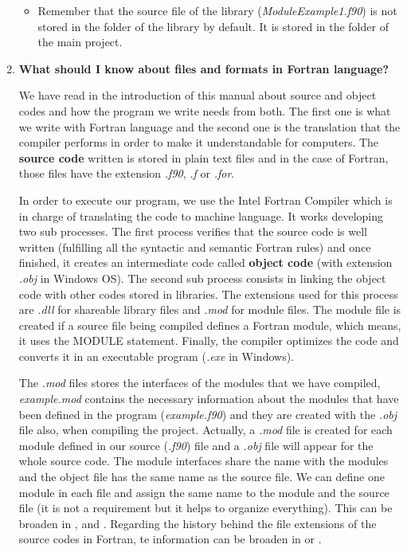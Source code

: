 \begin{enumerate}
\begin{IN}
\begin{itemize}
            \item Remember that the source file of the library (\textit{ModuleExample1.f90}) is not stored in the folder of the library by default. It is stored in the folder of the main project.
        \end{itemize}
    \end{IN}

    

	
    \FloatBarrier
    \item \textbf{What should I know about files and formats in Fortran language?}
    
    We have read in the introduction of this manual about source and object codes and how the program we write needs from both. The first one is what we write with Fortran language and the second one is the translation that the compiler performs in order to make it understandable for computers. The \textbf{source code} written is stored in plain text files and in the case of Fortran, those files have the extension \textit{.f90}, \textit{.f} or \textit{.for}. 
    
    \newpage
    In order to execute our program, we use the Intel\textregistered \hspace{0.1cm} Fortran Compiler which is in charge of translating the code to machine language. It works developing two sub processes. The first process verifies that the source code is well written (fulfilling all the syntactic and semantic Fortran rules) and once finished, it creates an intermediate code called \textbf{object code} (with extension \textit{.obj} in Windows OS). The second sub process consists in linking the object code with other codes stored in libraries. The extensions used for this process are \textit{.dll} for shareable library files and \textit{.mod} for module files. The module file is created if a source file being compiled defines a Fortran module, which means, it uses the MODULE statement. Finally, the compiler optimizes the code and converts it in an executable program (\textit{.exe} in Windows).
    
    The \textit{.mod} files stores the interfaces of the modules that we have compiled, \textit{example.mod} contains the necessary information about the modules that have been defined in the program (\textit{example.f90}) and they are created with the \textit{.obj} file also, when compiling the project. Actually, a \textit{.mod} file is created for each module defined in our source (\textit{.f90}) file and a \textit{.obj} file will appear for the whole source code. The module interfaces share the name with the modules and the object file has the same name as the source file. We can define one module in each file and assign the same name to the module and the source file (it is not a requirement but it helps to organize everything). This can be broaden in \citep{mod1}, \citet{mod2} and \citep{mod3}. Regarding the history behind the file extensions of the source codes in Fortran, te information can be broaden in \citet{f90} or \citet{f902}.
	    

\end{enumerate}
